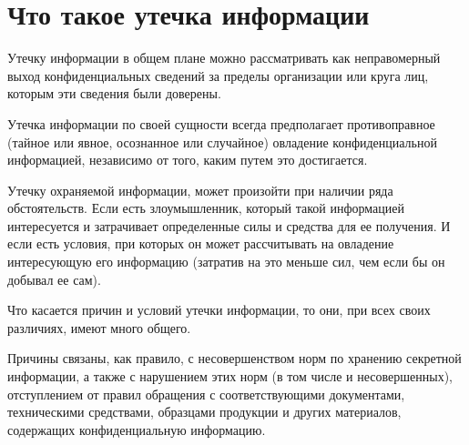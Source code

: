 \section{Что такое утечка информации}

Утечку информации  в общем плане можно рассматривать как неправомерный выход конфиденциальных сведений за пределы организации или круга лиц, которым эти сведения были доверены.

Утечка информации по своей сущности всегда предполагает противоправное (тайное или явное, осознанное или случайное) овладение конфиденциальной информацией, независимо от того, каким путем это достигается.

Утечку охраняемой информации, может произойти при наличии ряда обстоятельств. Если есть злоумышленник, который такой информацией интересуется и затрачивает определенные силы и средства для ее получения. И если есть условия, при которых он может рассчитывать на овладение интересующую его информацию (затратив на это меньше сил, чем если бы он добывал ее сам).

Что касается причин и условий утечки информации, то они, при всех своих различиях, имеют много общего.

Причины связаны, как правило, с несовершенством норм по хранению секретной информации, а также с нарушением этих норм (в том числе и несовершенных), отступлением от правил обращения с соответствующими документами, техническими средствами, образцами продукции и других материалов, содержащих конфиденциальную информацию.
